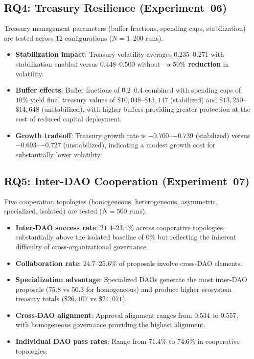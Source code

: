 \subsection{RQ4: Treasury Resilience (Experiment~06)}

Treasury management parameters (buffer fractions, spending caps, stabilization) are tested across $12$ configurations ($N=1{,}200$ runs).

\begin{itemize}
    \item \textbf{Stabilization impact}: Treasury volatility averages $0.235$--$0.271$ with stabilization enabled versus $0.448$--$0.500$ without---a \textbf{$50\%$ reduction} in volatility.
    \item \textbf{Buffer effects}: Buffer fractions of $0.2$--$0.4$ combined with spending caps of $10\%$ yield final treasury values of $\$10{,}048$--$\$13{,}147$ (stabilized) and $\$13{,}250$--$\$14{,}648$ (unstabilized), with higher buffers providing greater protection at the cost of reduced capital deployment.
    \item \textbf{Growth tradeoff}: Treasury growth rate is $-0.700$--$-0.739$ (stabilized) versus $-0.693$--$-0.727$ (unstabilized), indicating a modest growth cost for substantially lower volatility.
\end{itemize}

\subsection{RQ5: Inter-DAO Cooperation (Experiment~07)}

Five cooperation topologies (homogeneous, heterogeneous, asymmetric, specialized, isolated) are tested ($N=500$ runs).

\begin{itemize}
    \item \textbf{Inter-DAO success rate}: $21.4$--$23.4\%$ across cooperative topologies, substantially above the isolated baseline of $0\%$ but reflecting the inherent difficulty of cross-organizational governance.
    \item \textbf{Collaboration rate}: $24.7$--$25.6\%$ of proposals involve cross-DAO elements.
    \item \textbf{Specialization advantage}: Specialized DAOs generate the most inter-DAO proposals ($75.8$ vs $50.3$ for homogeneous) and produce higher ecosystem treasury totals ($\$26{,}107$ vs $\$24{,}071$).
    \item \textbf{Cross-DAO alignment}: Approval alignment ranges from $0.534$ to $0.557$, with homogeneous governance providing the highest alignment.
    \item \textbf{Individual DAO pass rates}: Range from $71.4\%$ to $74.6\%$ in cooperative topologies.
\end{itemize}

